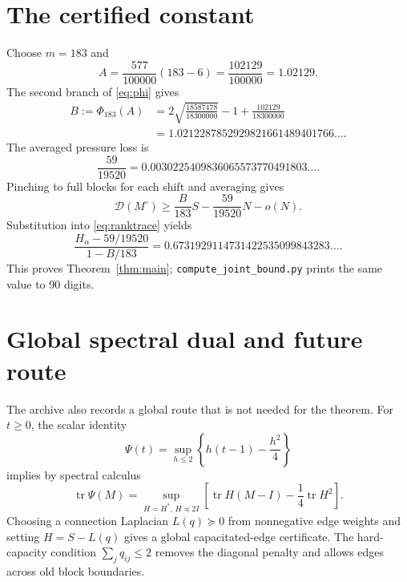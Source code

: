 \documentclass[11pt]{article}
\newcommand{\tr}{\operatorname{tr}}
\begin{document}
\section{The certified constant}
\label{sec:constant}
Choose $m=183$ and
\begin{equation}
 A=\frac{577}{100000}(183-6)=\frac{102129}{100000}=1.02129.
 \label{eq:A}
\end{equation}
The second branch of \eqref{eq:phi} gives
\begin{align}
 B:=\Phi_{183}(A)
 &=2\sqrt{\frac{18587478}{18300000}}-1
   +\frac{102129}{18300000}\\
 &=1.0212287852929821661489401766\ldots .
 \label{eq:B}
\end{align}
The averaged pressure loss is
\begin{equation}
 \frac{59}{19520}=0.0030225409836065573770491803\ldots .
 \label{eq:pressure}
\end{equation}
Pinching to full blocks for each shift and averaging gives
\begin{equation}
 \mathcal D(M^\circ)\ge\frac{B}{183}S-\frac{59}{19520}N-o(N).
 \label{eq:average}
\end{equation}
Substitution into \eqref{eq:ranktrace} yields
\begin{equation}
 \frac{H_\alpha-59/19520}{1-B/183}
 =0.6731929114731422535099843283\ldots .
 \label{eq:final}
\end{equation}
This proves Theorem~\ref{thm:main}; \texttt{compute\_joint\_bound.py} prints
the same value to 90 digits.

\section{Global spectral dual and future route}
\label{sec:dual}
The archive also records a global route that is not needed for the theorem.
For $t\ge0$, the scalar identity
\begin{equation}
 \Psi(t)=\sup_{h\le2}\left\{h(t-1)-\frac{h^2}{4}\right\}
 \label{eq:fenchel}
\end{equation}
implies by spectral calculus
\begin{equation}
 \tr\Psi(M)=\sup_{H=H^*,\,H\preceq2I}
 \left[\tr H(M-I)-\frac14\tr H^2\right].
 \label{eq:matrixfenchel}
\end{equation}
Choosing a connection Laplacian $L(q)\succeq0$ from nonnegative edge weights
and setting $H=S-L(q)$ gives a global capacitated-edge certificate.  The
hard-capacity condition $\sum_jq_{ij}\le2$ removes the diagonal penalty and
allows edges across old block boundaries.
\end{document}
